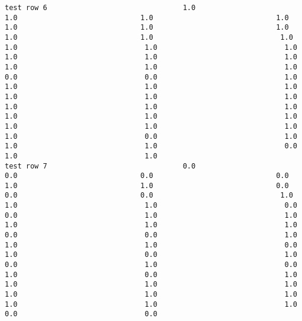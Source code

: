 \documentclass[11pt]{article}
\begin{document}
\begin{verbatim}
test row 6                                1.0                             1.0                             1.0                             1.0                             1.0                             1.0                             1.0                             1.0                             1.0                              1.0                              1.0                              1.0                              1.0                              1.0                              1.0                              1.0                              1.0                              1.0                              1.0                              0.0                              0.0                              1.0                              1.0                              1.0                              1.0                              1.0                              1.0                              1.0                              1.0                              1.0                              1.0                              1.0                              1.0                              1.0                              1.0                              1.0                              1.0                              1.0                              0.0                              1.0                              1.0                              1.0                              0.0                              1.0                              1.0
test row 7                                0.0                             0.0                             0.0                             0.0                             1.0                             1.0                             0.0                             0.0                             0.0                              1.0                              1.0                              1.0                              0.0                              0.0                              1.0                              1.0                              1.0                              1.0                              1.0                              0.0                              0.0                              1.0                              1.0                              1.0                              0.0                              1.0                              0.0                              1.0                              0.0                              1.0                              0.0                              1.0                              0.0                              1.0                              1.0                              1.0                              1.0                              1.0                              1.0                              1.0                              1.0                              1.0                              1.0                              0.0                              0.0

\end{verbatim}
\end{document}
